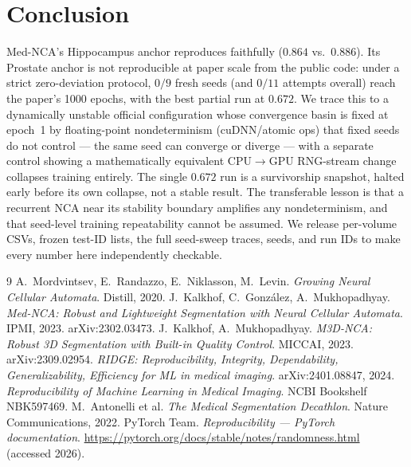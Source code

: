 \documentclass[10pt,twocolumn]{article}
\begin{document}
\section{Conclusion}
\label{sec:conclusion}

Med-NCA's Hippocampus anchor reproduces faithfully ($0.864$ vs.\ $0.886$).
Its Prostate anchor is not reproducible at paper scale from the public
code: under a strict zero-deviation protocol, $0/9$ fresh seeds (and
$0/11$ attempts overall) reach the paper's 1000 epochs, with the best
partial run at $0.672$. We trace this to a dynamically unstable official
configuration whose convergence basin is fixed at epoch~1 by floating-point
nondeterminism (cuDNN/atomic ops) that fixed seeds do not control --- the
same seed can converge or diverge --- with a separate control showing a
mathematically equivalent CPU$\rightarrow$GPU RNG-stream change collapses
training entirely. The single $0.672$ run is a survivorship snapshot, halted
early before its own collapse, not a stable result. The transferable lesson
is that a recurrent NCA near its stability boundary amplifies any
nondeterminism, and that seed-level training repeatability cannot be
assumed. We release
per-volume CSVs, frozen test-ID lists, the full seed-sweep traces, seeds,
and run IDs to make every number here independently checkable.

\begin{thebibliography}{9}
\small
{}
A.~Mordvintsev, E.~Randazzo, E.~Niklasson, M.~Levin.
\emph{Growing Neural Cellular Automata}. Distill, 2020.
J.~Kalkhof, C.~Gonz\'alez, A.~Mukhopadhyay.
\emph{Med-NCA: Robust and Lightweight Segmentation with Neural Cellular
Automata}. IPMI, 2023. arXiv:2302.03473.
J.~Kalkhof, A.~Mukhopadhyay.
\emph{M3D-NCA: Robust 3D Segmentation with Built-in Quality Control}.
MICCAI, 2023. arXiv:2309.02954.
\emph{RIDGE: Reproducibility, Integrity, Dependability, Generalizability,
Efficiency for ML in medical imaging}. arXiv:2401.08847, 2024.
\emph{Reproducibility of Machine Learning in Medical Imaging}.
NCBI Bookshelf NBK597469.
M.~Antonelli et al.
\emph{The Medical Segmentation Decathlon}. Nature Communications, 2022.
PyTorch Team.
\emph{Reproducibility --- PyTorch documentation}.
\url{https://pytorch.org/docs/stable/notes/randomness.html} (accessed 2026).
\end{thebibliography}
\end{document}
